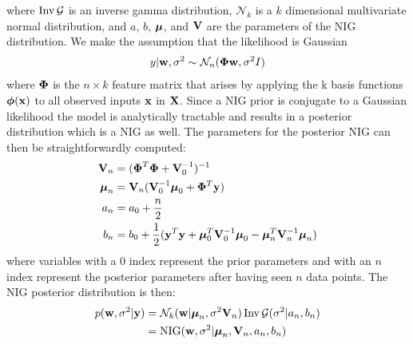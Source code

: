 \documentclass[../thesis.tex]{subfiles}
\begin{document}
where $\operatorname{Inv}\mathcal{G}$ is an inverse gamma distribution, $\mathcal{N}_k$ is a $k$ dimensional multivariate normal distribution, and $a$, $b$, $\boldsymbol{\mathbf{\mu}}$, and $\boldsymbol{\mathbf{V}}$ are the parameters of the NIG distribution. We make the assumption that the likelihood is Gaussian
\begin{equation}
    \begin{split}
        y | \boldsymbol{\mathbf{w}}, \sigma^2  \sim  \mathcal{N}_n (\boldsymbol{\mathbf{\Phi}} \boldsymbol{\mathbf{w}}, \sigma^2 I) 
    \end{split}
\end{equation}
where $\boldsymbol{\mathbf{\Phi}}$ is the $n \times k$ feature matrix that arises by applying the k basis functions $\boldsymbol{\mathbf{\phi}}(\boldsymbol{\mathbf{x}})$ to all observed inputs $\boldsymbol{\mathbf{x}}$ in $\boldsymbol{\mathbf{X}}$. Since a NIG prior is conjugate to a Gaussian likelihood the model is analytically tractable and results in a posterior distribution which is a NIG as well. The parameters for the posterior NIG can then be straightforwardly computed:
\begin{equation}
    \begin{split}
        \boldsymbol{\mathbf{V}}_n &= (\boldsymbol{\mathbf{\Phi}}^T \boldsymbol{\mathbf{\Phi}} + \boldsymbol{\mathbf{V}}_0^{-1})^{-1} \\
        \boldsymbol{\mathbf{\mu}}_n &= \boldsymbol{\mathbf{V}}_n (\boldsymbol{\mathbf{V}}_0^{-1} \boldsymbol{\mathbf{\mu}}_0 + \boldsymbol{\mathbf{\Phi}}^T \boldsymbol{\mathbf{y}}) \\
        a_n &= a_0 + \frac{n}{2} \\
        b_n &= b_0 + \frac{1}{2} (\boldsymbol{\mathbf{y}}^T \boldsymbol{\mathbf{y}} + \boldsymbol{\mathbf{\mu}}_0^T \boldsymbol{\mathbf{V}}_0^{-1}\boldsymbol{\mathbf{\mu}}_0 - \boldsymbol{\mathbf{\mu}}_n^T \boldsymbol{\mathbf{V}}_n^{-1} \boldsymbol{\mathbf{\mu}}_n)
    \end{split}
\end{equation}
where variables with a 0 index represent the prior parameters and with an $n$ index represent the posterior parameters after having seen $n$ data points. The NIG posterior distribution is then:
\begin{equation}
    \begin{split}
    p(\boldsymbol{\mathbf{w}}, \sigma^2 | \boldsymbol{\mathbf{y}}) &= \mathcal{N}_k(\boldsymbol{\mathbf{w}} | \boldsymbol{\mathbf{\mu}}_n, \sigma^2 \boldsymbol{\mathbf{V}}_n) \operatorname{Inv}\mathcal{G}(\sigma^2 | a_n, b_n)  \\  
    &= \operatorname{NIG}(\boldsymbol{\mathbf{w}}, \sigma^2 | \boldsymbol{\mathbf{\mu}}_n, \boldsymbol{\mathbf{V}}_n, a_n, b_n)
    \end{split}
\end{equation}
\end{document}
